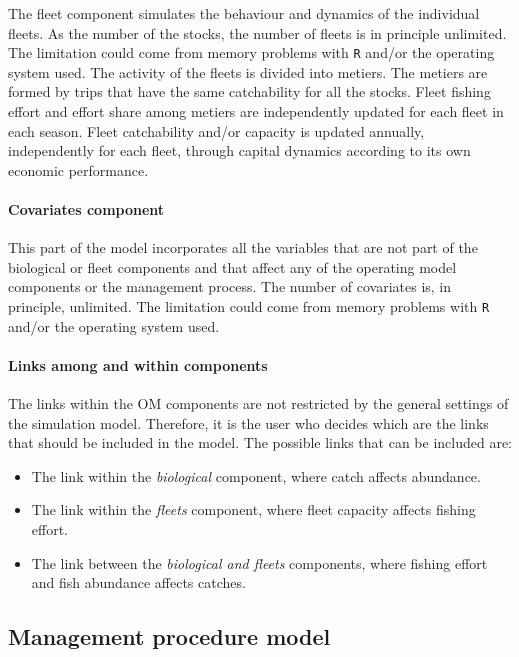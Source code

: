   The fleet component simulates the behaviour and dynamics of the individual fleets. As the number of the stocks, the number of fleets is in 
  principle unlimited. The limitation could come from memory problems with \texttt{R} and/or the operating system used. The activity of the fleets is divided into metiers. The metiers are formed by trips that have the same catchability for all the stocks. 
  Fleet fishing effort and effort share among metiers are independently updated for each fleet in each season. Fleet catchability and/or capacity is updated annually, independently for each fleet, through capital dynamics according to its own economic performance. 

\paragraph{Covariates component} \hspace{0pt} \smallskip

  This part of the model incorporates all the variables that are not part of the biological or fleet components and that affect any of the operating model components or the management process. The number of covariates is, in principle, unlimited. The limitation could come from memory problems with \texttt{R} and/or the operating system used.

\paragraph{Links among and within components} \hspace{0pt} \smallskip

  The links within the OM components are not restricted by the general settings of the simulation model. Therefore, it is the user who decides 
  which are the links that should be included in the model. The possible links that can be included are:

  \begin{itemize}
  	\item The link within the \textsl{biological} component, where catch affects abundance.
  	\item The link within the \textsl{fleets} component, where fleet capacity affects fishing effort. 
  	\item The link between the \textsl{biological and fleets} components, where fishing effort and fish abundance affects catches. 
  \end{itemize}

 
\subsection{Management procedure model}

